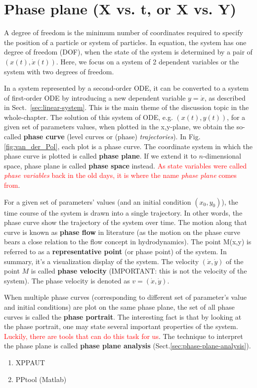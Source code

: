 \section{Phase plane (X vs. t, or X vs. Y)}
\label{sec:phase-plane}

A degree of freedom is the minimum number of coordinates required to specify the
position of a particle or system of particles. In equation, the system has one
degree of freedom (DOF), when the state of the system is determined by a pair of
$(x(t), \dot{x}(t))$.  Here, we focus on a system of 2 dependent variables or
the system with two degrees of freedom.

In a system represented by a second-order ODE, it can be converted to a system
of first-order ODE by introducing a new dependent variable $y=\dot{x}$, as
described in Sect.~\ref{sec:linear-system}. This is the main theme of the
discussion topic in the whole-chapter. The solution of this system of ODE, e.g.
$(x(t),y(t))$, for a given set of parameters values, when plotted in the
x,y-plane, we obtain the so-called {\bf phase curve} (level curves or (phase)
{\it trajectories}). In Fig.\ref{fig:van_der_Pol}, each plot is a phase curve.
The coordinate system in which the phase curve is plotted is called {\bf phase
plane}. If we extend it to $n$-dimensional space, phase plane is called {\bf
phase space} instead. \textcolor{red}{As state variables were called {\it phase
variables} back in the old days, it is where the name {\it phase plane} comes
from}.

For a given set of parameters' values (and an initial condition $(x_0,y_0)$),
the time course of the system is drawn into a single trajectory. In other words,
the phase curve show the trajectory of the system over time. The motion along
that curve is known as {\bf phase flow} in literature (as the motion on the
phase curve bears a close relation to the flow concept in hydrodynamics).  The
point M(x,y) is referred to as a {\bf representative point} (or phase point) of
the system.  In summary, it's a visualization display of the system. The
velocity $(\dot{x}, \dot{y})$ of the point $M$ is called {\bf phase velocity}
(IMPORTANT: this is not the velocity of the system). The phase velocity is
denoted as $v=(\dot{x},\dot{y})$.

When multiple phase curves (corresponding to different set of parameter's value
and initial conditions) are plot on the same phase plane, the set of all phase
curves is called the {\bf phase portrait}.  The interesting fact is that by
looking at the phase portrait, one may state several important properties of the
system.
\textcolor{red}{Luckily, there are tools that can do this task for us}. The
technique to interpret the phase plane is called {\bf phase plane analysis}
(Sect.\ref{sec:phase-plane-analysis}).
\begin{enumerate}
\item XPPAUT
\item PPtool (Matlab)
\end{enumerate}

